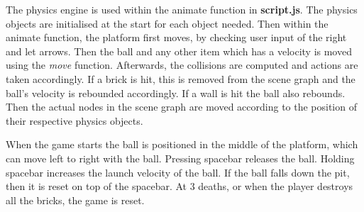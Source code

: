 The physics engine is used within the animate function in \textbf{script.js}. The physics objects are initialised at the start for each object needed. Then within the animate function, the platform first moves, by checking user input of the right and let arrows. Then the ball and any other item which has a velocity is moved using the \textit{move} function. Afterwards, the collisions are computed and actions are taken accordingly. If a brick is hit, this is removed from the scene graph and the ball's velocity is rebounded accordingly. If a wall is hit the ball also rebounds. Then the actual nodes in the scene graph are moved according to the position of their respective physics objects.

When the game starts the ball is positioned in the middle of the platform, which can move left to right with the ball. Pressing spacebar releases the ball. Holding spacebar increases the launch velocity of the ball. If the ball falls down the pit, then it is reset on top of the spacebar. At 3 deaths, or when the player destroys all the bricks, the game is reset.
